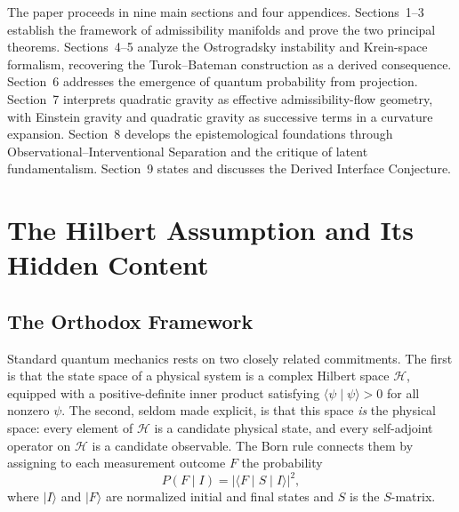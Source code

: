 \documentclass[12pt,a4paper]{article}
\theoremstyle{remark}
\begin{document}
The paper proceeds in nine main sections and four appendices. Sections~1--3
establish the framework of admissibility manifolds and prove the two
principal theorems. Sections~4--5 analyze the Ostrogradsky instability and
Krein-space formalism, recovering the Turok--Bateman construction as a
derived consequence. Section~6 addresses the emergence of quantum probability
from projection. Section~7 interprets quadratic gravity as effective
admissibility-flow geometry, with Einstein gravity and quadratic
gravity as successive terms in a curvature expansion. Section~8 develops
the epistemological foundations through Observational--Interventional
Separation and the critique of latent fundamentalism. Section~9 states
and discusses the Derived Interface Conjecture.


\section{The Hilbert Assumption and Its Hidden Content}

\subsection{The Orthodox Framework}

Standard quantum mechanics rests on two closely related commitments. The
first is that the state space of a physical system is a complex Hilbert
space $\mathcal{H}$, equipped with a positive-definite inner product
satisfying $\langle\psi\mid\psi\rangle > 0$ for all nonzero $\psi$. The
second, seldom made explicit, is that this space \emph{is} the physical
space: every element of $\mathcal{H}$ is a candidate physical state, and
every self-adjoint operator on $\mathcal{H}$ is a candidate observable.
The Born rule connects them by assigning to each measurement outcome $F$
the probability
\begin{equation}
  P(F \mid I) = |\langle F \mid S \mid I \rangle|^2,
\end{equation}
where $\lvert I\rangle$ and $\lvert F\rangle$ are normalized initial and
final states and $S$ is the $S$-matrix.
\end{document}
